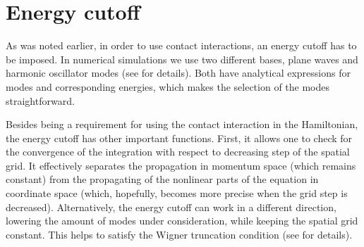 \section{Energy cutoff}

As was noted earlier, in order to use contact interactions, an energy cutoff has to be imposed.
In numerical simulations we use two different bases, plane waves and harmonic oscillator modes (see  for details).
Both have analytical expressions for modes and corresponding energies, which makes the selection of the modes straightforward.

Besides being a requirement for using the contact interaction in the Hamiltonian, the energy cutoff has other important functions.
First, it allows one to check for the convergence of the integration with respect to decreasing step of the spatial grid.
It effectively separates the propagation in momentum space (which remains constant) from the propagating of the nonlinear parts of the equation in coordinate space (which, hopefully, becomes more precise when the grid step is decreased).
Alternatively, the energy cutoff can work in a different direction, lowering the amount of modes under consideration, while keeping the spatial grid constant.
This helps to satisfy the Wigner truncation condition (see  for details).
